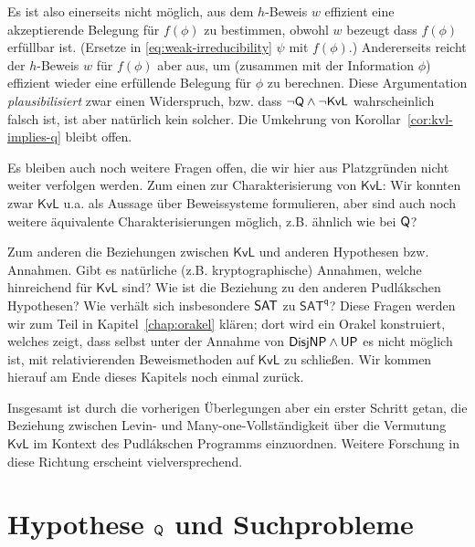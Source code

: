 Es ist also einerseits nicht möglich, aus dem $h$-Beweis $w$ effizient eine akzeptierende Belegung für $f(\phi)$ zu bestimmen, obwohl $w$ bezeugt dass $f(\phi)$ erfüllbar ist. (Ersetze in \eqref{eq:weak-irreducibility} $\psi$ mit $f(\phi)$.)
Andererseits reicht der $h$-Beweis $w$ für $f(\phi)$ aber aus, um (zusammen mit der Information $\phi$) effizient wieder eine erfüllende Belegung für $\phi$ zu berechnen. 
Diese Argumentation \emph{plausibilisiert} zwar einen Widerspruch, bzw. dass $\neg\mathsf{Q}\land\neg\mathsf{KvL}$ wahrscheinlich falsch ist, ist aber natürlich kein solcher. Die Umkehrung von Korollar~\ref{cor:kvl-implies-q} bleibt offen.

Es bleiben auch noch weitere Fragen offen, die wir hier aus Platzgründen nicht weiter verfolgen werden. 
Zum einen zur Charakterisierung von $\mathsf{KvL}$:
Wir konnten zwar $\mathsf{KvL}$ u.a. als Aussage über Beweissysteme formulieren, aber sind auch noch weitere äquivalente Charakterisierungen möglich, z.B. ähnlich wie bei $\mathsf{Q}$?

Zum anderen die Beziehungen zwischen $\mathsf{KvL}$ und anderen Hypothesen bzw. Annahmen.
Gibt es natürliche (z.B. kryptographische) Annahmen, welche hinreichend für $\mathsf{KvL}$ sind? Wie ist die Beziehung zu den anderen Pudlákschen Hypothesen? Wie verhält sich insbesondere $\mathsf{SAT}$ zu $\mathsf{SAT^{q}}$? 
Diese Fragen werden wir zum Teil in Kapitel~\ref{chap:orakel} klären; dort wird ein Orakel konstruiert, welches zeigt, dass selbst unter der Annahme von $\mathsf{DisjNP}\land\mathsf{UP}$ es nicht möglich ist, mit relativierenden Beweismethoden auf $\mathsf{KvL}$ zu schließen.
Wir kommen hierauf am Ende dieses Kapitels noch einmal zurück.

Insgesamt ist durch die vorherigen Überlegungen aber ein erster Schritt getan, die Beziehung zwischen Levin- und Many-one-Vollständigkeit über die Vermutung $\mathsf{KvL}$ im Kontext des Pudlákschen Programms einzuordnen.
Weitere Forschung in diese Richtung erscheint vielversprechend.

\section{Hypothese $\mathsf{Q}$ und Suchprobleme}\label{sec:q-vs-search}


